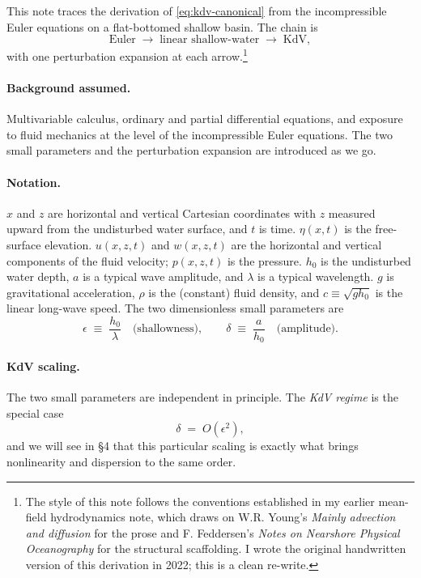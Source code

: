 \documentclass{article}
\begin{document}
This note traces the derivation of \eqref{eq:kdv-canonical} from the incompressible Euler equations on a flat-bottomed shallow basin. The chain is
\[
\text{Euler} \;\longrightarrow\; \text{linear shallow-water} \;\longrightarrow\; \text{KdV},
\]
with one perturbation expansion at each arrow.\footnote{The style of this note follows the conventions established in my earlier mean-field hydrodynamics note, which draws on W.R. Young's \emph{Mainly advection and diffusion} for the prose and F. Feddersen's \emph{Notes on Nearshore Physical Oceanography} for the structural scaffolding. I wrote the original handwritten version of this derivation in 2022; this is a clean re-write.}

\paragraph{Background assumed.} Multivariable calculus, ordinary and partial differential equations, and exposure to fluid mechanics at the level of the incompressible Euler equations. The two small parameters and the perturbation expansion are introduced as we go.

\paragraph{Notation.} \(x\) and \(z\) are horizontal and vertical Cartesian coordinates with \(z\) measured upward from the undisturbed water surface, and \(t\) is time. \(\eta(x,t)\) is the free-surface elevation. \(u(x,z,t)\) and \(w(x,z,t)\) are the horizontal and vertical components of the fluid velocity; \(p(x,z,t)\) is the pressure. \(h_0\) is the undisturbed water depth, \(a\) is a typical wave amplitude, and \(\lambda\) is a typical wavelength. \(g\) is gravitational acceleration, \(\rho\) is the (constant) fluid density, and \(c \equiv \sqrt{g h_0}\) is the linear long-wave speed. The two dimensionless small parameters are
\[
\epsilon \;\equiv\; \frac{h_0}{\lambda} \quad \text{(shallowness)}, \qquad
\delta \;\equiv\; \frac{a}{h_0} \quad \text{(amplitude)}.
\]

\paragraph{KdV scaling.} The two small parameters are independent in principle. The \emph{KdV regime} is the special case
\[
\delta \;=\; O(\epsilon^2),
\]
and we will see in \S 4 that this particular scaling is exactly what brings nonlinearity and dispersion to the same order.
\end{document}
